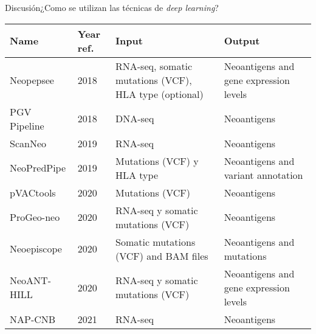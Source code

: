 \documentclass[10pt]{beamer}
\newcommand{\1}{
	\setbeamertemplate{background}{
		\texttt{[image: img/1]}
		\tikz[overlay] \fill[fill opacity=0.75,fill=white] (0,0) rectangle (-\paperwidth,\paperheight);
	}
}
\begin{document}
\begin{frame}{Discusión}{¿Como se utilizan las técnicas de \textit{deep learning}?}
	
	\fontsize{7pt}{5pt}\selectfont
	
	\begin{table}[]
		\centering
		\setlength{\tabcolsep}{0.5em} %
		{\renewcommand{\arraystretch}{2}%
			\begin{tabular}{lp{1.2cm}p{2.5cm}p{2.5cm}}
				\textbf{Name} & \textbf{Year ref.}                                  & \textbf{Input}                                         & \textbf{Output}                                     \\ \hline
				Neopepsee       & 2018 \cite{kim2018neopepsee}           & RNA-seq, somatic mutations (VCF), HLA type (optional) & Neoantigens and gene expression levels   \\ 
				PGV Pipeline    & 2018 \cite{rubinsteyn2018computational}& DNA-seq                                                  & Neoantigens                                       \\
				ScanNeo         & 2019 \cite{wang2019scanneo}            & RNA-seq                                                  & Neoantigens                                       \\
				NeoPredPipe     & 2019 \cite{schenck2019neopredpipe}     & Mutations (VCF) y HLA type                           & Neoantigens and variant annotation              \\
				pVACtools       & 2020 \cite{hundal2020pvactools}        & Mutations (VCF)                                         & Neoantigens                                       \\
				ProGeo-neo      & 2020 \cite{li2020progeo}               & RNA-seq y somatic mutations (VCF)                        & Neoantigens                                       \\
				Neoepiscope     & 2020 \cite{wood2020neoepiscope}        & Somatic mutations (VCF) and BAM files                  & Neoantigens and mutations                          \\
				NeoANT-HILL     & 2020 \cite{coelho2020neoant}           & RNA-seq y somatic mutations (VCF)                        & Neoantigens and gene expression levels \\
				NAP-CNB         & 2021 \cite{wert2021predicting}         & RNA-seq                                                  & Neoantigens                                       \\
				

\end{tabular}}
\end{table}
\end{frame}
\end{document}
